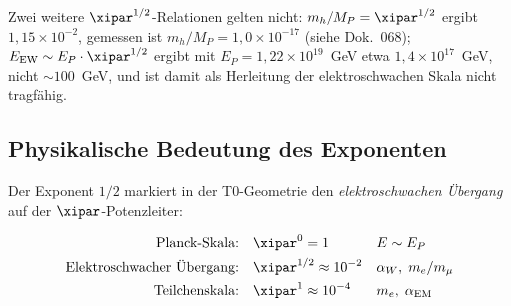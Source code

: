 \begin{table}[H]
    \centering
    \caption{Der Exponent $\xipar^{1/2} = 0{,}011547$ tritt in der T0-Theorie
    als universeller elektroschwacher Exponent auf. Er markiert den geometrischen
    Übergang von der Planck-Welt zur Teilchenphysik-Skala.}
    \label{tab:xi12}
\end{table}

Zwei weitere $\xipar^{1/2}$-Relationen gelten nicht: $m_h/M_P = \xipar^{1/2}$ ergibt
$1{,}15\times10^{-2}$, gemessen ist $m_h/M_P = 1{,}0\times10^{-17}$ (siehe Dok.~068);
$E_\mathrm{EW} \sim E_P\cdot\xipar^{1/2}$ ergibt mit $E_P = 1{,}22\times10^{19}$~GeV etwa
$1{,}4\times10^{17}$~GeV, nicht $\sim 100$~GeV, und ist damit als Herleitung der
elektroschwachen Skala nicht tragfähig.

\subsection{Physikalische Bedeutung des Exponenten}

Der Exponent $1/2$ markiert in der T0-Geometrie den \emph{elektroschwachen
Übergang} auf der $\xipar$-Potenzleiter:

\begin{align}
    \text{Planck-Skala:}\quad          & \xipar^0     = 1
        && E \sim E_P \notag \\
    \text{Elektroschwacher Übergang:}\quad & \xipar^{1/2} \approx 10^{-2}
        && \alpha_W,\; m_e/m_\mu
        \label{eq:stufe} \\
    \text{Teilchenskala:}\quad         & \xipar^1     \approx 10^{-4}
        && m_e,\; \alpha_\mathrm{EM} \notag
\end{align}

